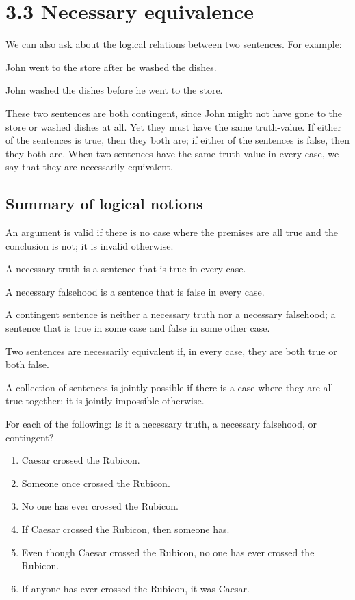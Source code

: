 \section{3.3 Necessary equivalence}
We can also ask about the logical relations between two sentences. For example:
\begin{earg}
\item[]John went to the store after he washed the dishes.
\item[]John washed the dishes before he went to the store.
\end{earg}
These two sentences are both contingent, since John might not have gone to the store or washed dishes at all. Yet they must have the same truth-value. If either of the sentences is true, then they both are; if either of the sentences is false, then they both are. When two sentences have the same truth value in every case, we say that they are necessarily equivalent.
\subsection{Summary of logical notions}
\begin{ebullet}
\item[\textbullet] An argument is valid if there is no case where the premises are all true and the conclusion is not; it is invalid otherwise.
\item[\textbullet] A necessary truth is a sentence that is true in every case.
\item[\textbullet] A necessary falsehood is a sentence that is false in every case.
\item[\textbullet] A contingent sentence is neither a necessary truth nor a necessary falsehood; a sentence that is true in some case and false in some other case.
\item[\textbullet] Two sentences are necessarily equivalent if, in every case, they are both true or both false.
\item[\textbullet] A collection of sentences is jointly possible if there is a case where they are all true together; it is jointly impossible otherwise.
\end{ebullet}

\practiceproblems
\problempart
\label{pr.EnglishTautology2}
For each of the following: Is it a necessary truth, a necessary falsehood, or contingent?
\begin{enumerate}
\item Caesar crossed the Rubicon.
\item Someone once crossed the Rubicon.
\item No one has ever crossed the Rubicon.
\item If Caesar crossed the Rubicon, then someone has.
\item Even though Caesar crossed the Rubicon, no one has ever crossed the Rubicon.
\item If anyone has ever crossed the Rubicon, it was Caesar.
\end{enumerate}

